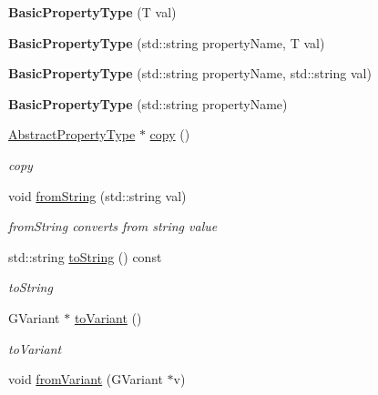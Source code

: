 \begin{DoxyCompactItemize}
\item 
\hypertarget{classBasicPropertyType_a0fcc2038187aad4b1ee6223daaff65d6}{{\bfseries Basic\-Property\-Type} (T val)}\label{classBasicPropertyType_a0fcc2038187aad4b1ee6223daaff65d6}

\item 
\hypertarget{classBasicPropertyType_a5336941eaf15eefbfc9f84554619b72d}{{\bfseries Basic\-Property\-Type} (std\-::string property\-Name, T val)}\label{classBasicPropertyType_a5336941eaf15eefbfc9f84554619b72d}

\item 
\hypertarget{classBasicPropertyType_a1bb538ecec45a113bbfc1fa23eabfde1}{{\bfseries Basic\-Property\-Type} (std\-::string property\-Name, std\-::string val)}\label{classBasicPropertyType_a1bb538ecec45a113bbfc1fa23eabfde1}

\item 
\hypertarget{classBasicPropertyType_a4f8b38f1e145d5ee7387a58faaef8e60}{{\bfseries Basic\-Property\-Type} (std\-::string property\-Name)}\label{classBasicPropertyType_a4f8b38f1e145d5ee7387a58faaef8e60}

\item 
\hyperlink{classAbstractPropertyType}{Abstract\-Property\-Type} $\ast$ \hyperlink{classBasicPropertyType_a244d19253bfc42dfadd84570b8c8e404}{copy} ()
\begin{DoxyCompactList}\small\item\em copy \end{DoxyCompactList}\item 
\hypertarget{classBasicPropertyType_a3c73a6a2c2c020ec327849f318ae9f2a}{void \hyperlink{classBasicPropertyType_a3c73a6a2c2c020ec327849f318ae9f2a}{from\-String} (std\-::string val)}\label{classBasicPropertyType_a3c73a6a2c2c020ec327849f318ae9f2a}

\begin{DoxyCompactList}\small\item\em from\-String converts from string value \end{DoxyCompactList}\item 
std\-::string \hyperlink{classBasicPropertyType_a672e2824bcc38da6e60090022fd8d114}{to\-String} () const 
\begin{DoxyCompactList}\small\item\em to\-String \end{DoxyCompactList}\item 
G\-Variant $\ast$ \hyperlink{classBasicPropertyType_a893a2d1f8fec7141159d850caa78bc06}{to\-Variant} ()
\begin{DoxyCompactList}\small\item\em to\-Variant \end{DoxyCompactList}\item 
\hypertarget{classBasicPropertyType_a0e1213ee2df11ecd556b250fe3bad21b}{void \hyperlink{classBasicPropertyType_a0e1213ee2df11ecd556b250fe3bad21b}{from\-Variant} (G\-Variant $\ast$v)}\label{classBasicPropertyType_a0e1213ee2df11ecd556b250fe3bad21b}


\end{DoxyCompactItemize}
